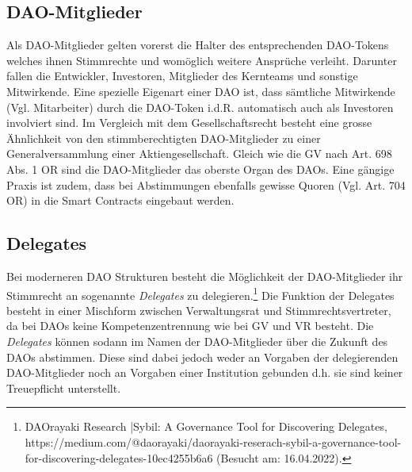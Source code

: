 \documentclass[a4paper,12pt]{report}
\begin{document}
	\subsection{DAO-Mitglieder}
	\startsubsection
	Als DAO-Mitglieder gelten vorerst die Halter des entsprechenden DAO-Tokens welches ihnen Stimmrechte und womöglich weitere Ansprüche verleiht. Darunter fallen die Entwickler, Investoren, Mitglieder des Kernteams und sonstige Mitwirkende. Eine spezielle Eigenart einer DAO ist, dass sämtliche Mitwirkende (Vgl. Mitarbeiter) durch die DAO-Token i.d.R. automatisch auch als Investoren involviert sind. Im Vergleich mit dem Gesellschaftsrecht besteht eine grosse Ähnlichkeit von den stimmberechtigten DAO-Mitglieder zu einer Generalversammlung einer Aktiengesellschaft. Gleich wie die GV nach Art. 698 Abs. 1 OR sind die DAO-Mitglieder das oberste Organ des DAOs. Eine gängige Praxis ist zudem, dass bei Abstimmungen ebenfalls gewisse Quoren (Vgl. Art. 704 OR) in die Smart Contracts eingebaut werden.
	\closesection
	
	\subsection{Delegates}
	\startsubsection
    Bei moderneren DAO Strukturen besteht die Möglichkeit der DAO-Mitglieder ihr Stimmrecht an sogenannte \textit{Delegates} zu delegieren.\footnote{\hspace{0.5em}\begin{minipage}[t]{13cm}DAOrayaki Research |Sybil: A Governance Tool for Discovering Delegates, https://medium.com/@daorayaki/daorayaki-reserach-sybil-a-governance-tool-for-discovering-delegates-10ec4255b6a6 (Besucht am: 16.04.2022).\end{minipage}} Die Funktion der Delegates besteht in einer Mischform zwischen Verwaltungsrat und Stimmrechtsvertreter, da bei DAOs keine Kompetenzentrennung wie bei GV und VR besteht. Die \textit{Delegates} können sodann im Namen der DAO-Mitglieder über die Zukunft des DAOs abstimmen. Diese sind dabei jedoch weder an Vorgaben der delegierenden DAO-Mitglieder noch an Vorgaben einer Institution gebunden d.h. sie sind keiner Treuepflicht unterstellt.
	\closesection
	\closesection
\end{document}
